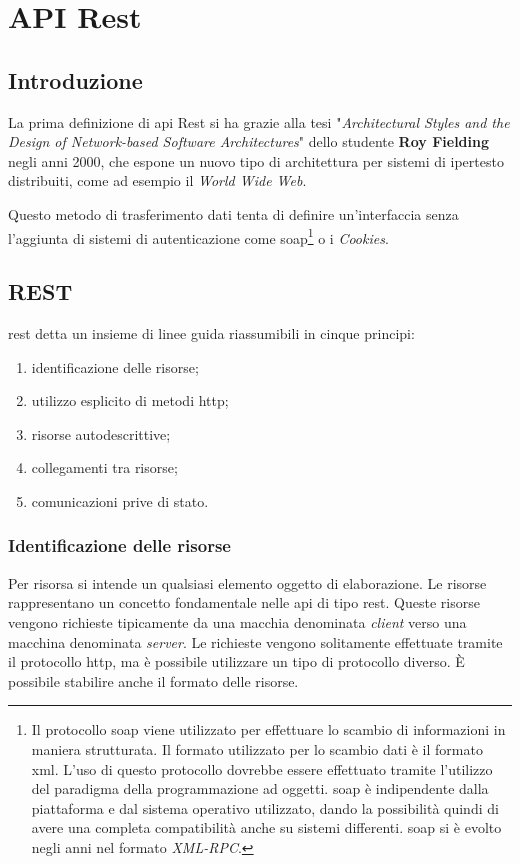 \chapter{API Rest}

\section{Introduzione}
La prima definizione di \gls{api} Rest si ha grazie alla tesi
"\textit{Architectural Styles and the Design of Network-based Software
Architectures}" dello studente \textbf{Roy Fielding} negli anni 2000, che
espone un nuovo tipo di architettura per sistemi di ipertesto distribuiti, come
ad esempio il \textit{World Wide Web}.

Questo metodo di trasferimento dati tenta di definire un'interfaccia senza
l'aggiunta di sistemi di autenticazione come \gls{soap}\footnote{Il protocollo
\gls{soap} viene utilizzato per effettuare lo
scambio di informazioni in maniera strutturata. Il formato utilizzato per lo
scambio dati è il formato \gls{xml}. L'uso di questo protocollo dovrebbe essere
effettuato tramite l'utilizzo del paradigma della programmazione ad oggetti.
\gls{soap} è indipendente dalla piattaforma e dal sistema operativo utilizzato,
dando la possibilità quindi di avere una completa compatibilità anche su
sistemi differenti. \gls{soap} si è evolto negli anni nel formato
\textit{XML-RPC}.} o i \textit{Cookies}.

\section{REST}

\gls{rest} detta un insieme di linee guida riassumibili in cinque principi:
\begin{enumerate}
  \item identificazione delle risorse;
  \item utilizzo esplicito di metodi \gls{http};
  \item risorse autodescrittive;
  \item collegamenti tra risorse;
  \item comunicazioni prive di stato.
\end{enumerate}

\subsection{Identificazione delle risorse}
Per risorsa si intende un qualsiasi elemento oggetto di elaborazione.
Le risorse rappresentano un concetto fondamentale nelle \gls{api} di tipo
\gls{rest}. Queste risorse vengono richieste tipicamente da una macchia
denominata \textit{client} verso una macchina denominata \textit{server}. Le
richieste vengono solitamente effettuate tramite il protocollo \gls{http}, ma è
possibile utilizzare un tipo di protocollo diverso. È possibile stabilire anche
il formato delle risorse.

